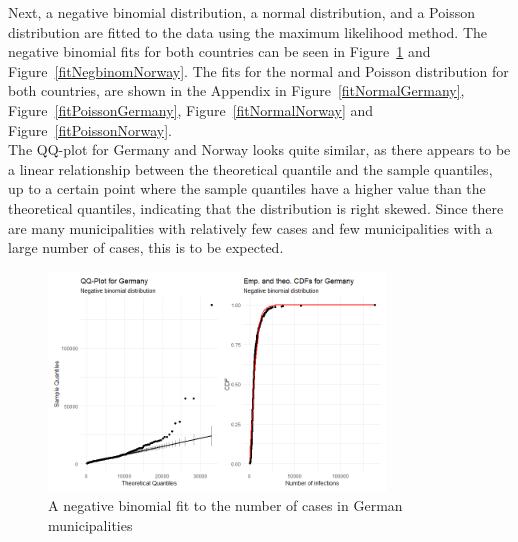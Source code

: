 Next, a negative binomial distribution, a normal distribution, and a Poisson distribution are fitted to the data using the maximum likelihood method. The negative binomial fits for both countries can be seen in Figure~\ref{fitNegbinomGermany} and Figure~\ref{fitNegbinomNorway}. The fits for the normal and Poisson distribution for both countries, are shown in the Appendix in Figure~\ref{fitNormalGermany}, Figure~\ref{fitPoissonGermany}, Figure~\ref{fitNormalNorway} and Figure~\ref{fitPoissonNorway}. \\
The QQ-plot for Germany and Norway looks quite similar, as there appears to be a linear relationship between the theoretical quantile and the sample quantiles, up to a certain point where the sample quantiles have a higher value than the theoretical quantiles, indicating that the distribution is right skewed. Since there are many municipalities with relatively few cases and few municipalities with a large number of cases, this is to be expected.
%     
\begin{figure}[H]
    \centering
    \includegraphics[width = 0.8\textwidth]{fit_nbinom_germany.png}
    \caption{A negative binomial fit to the number of cases in German municipalities}
    \label{fitNegbinomGermany}
\end{figure}
%     
